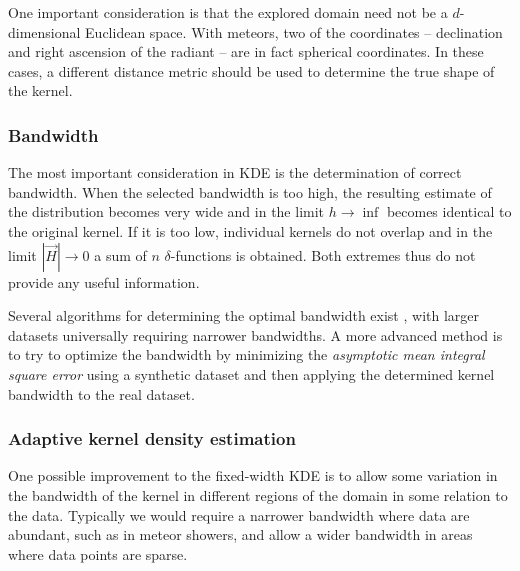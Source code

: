             One important consideration is that the explored domain need not be
            a $d$-dimensional Euclidean space. With meteors, two of the coordinates -- declination
            and right ascension of the radiant -- are in fact spherical coordinates.
            In these cases, a different distance metric should be used to determine the true shape of the kernel.

        \subsubsection{Bandwidth} \label{mmkw}
            The most important consideration in KDE is the determination of correct bandwidth.
            When the selected bandwidth is too high, the resulting estimate of the distribution
            becomes very wide and in the limit $h \to \inf$ becomes identical to the original kernel.
            If it is too low, individual kernels do not overlap and in the limit $\left|\vec{H}\right| \to 0$
            a sum of $n$ $\delta$-functions is obtained. Both extremes thus do not provide any useful information.

            Several algorithms for determining the optimal bandwidth exist \citep{bowman1985,jones+1996},
            with larger datasets universally requiring narrower bandwidths.
            A more advanced method is to try to optimize the bandwidth by minimizing the
            \emph{asymptotic mean integral square error} using a synthetic dataset and
            then applying the determined kernel bandwidth to the real dataset.

        \subsubsection{Adaptive kernel density estimation} \label{mmka}
            One possible improvement to the fixed-width KDE is to allow some variation in the bandwidth
            of the kernel in different regions of the domain in some relation to the data.
            Typically we would require a narrower bandwidth where data are abundant,
            such as in meteor showers, and allow a wider bandwidth in areas where data points are sparse.

